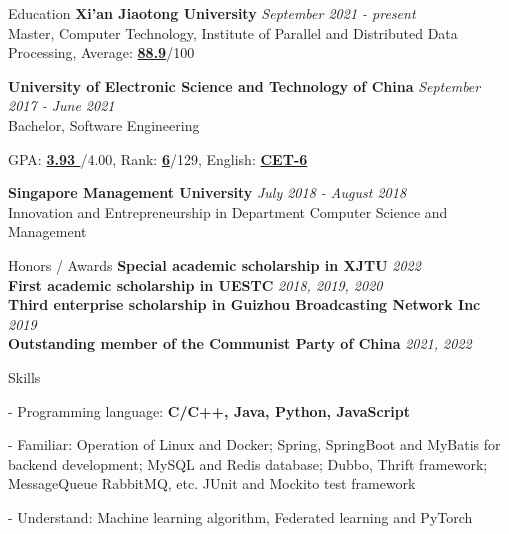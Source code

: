 \documentclass{resume} %
\begin{document}

\begin{rSection}{Education}
{\textbf{Xi'an Jiaotong University}} \hfill {\em September 2021 - present} \\ 
Master, Computer Technology, Institute of Parallel and Distributed Data Processing, Average: \textbf{\underline{88.9}}/100

{\textbf{University of Electronic Science and Technology of China}} \hfill {\em September 2017 - June 2021} \\
Bachelor, Software Engineering
\begin{rSubsection}{}{}{}{}
\item GPA: \textbf{\underline{ 3.93 }}/4.00, Rank: \textbf{\underline{6}}/129, English: \textbf{\underline{CET-6}}
\end{rSubsection}

{\textbf{Singapore Management University}} \hfill {\em July 2018 - August 2018} \\ 
Innovation and Entrepreneurship in Department Computer Science and Management

\end{rSection}


\begin{rSection}{Honors / Awards}
    {\textbf{Special academic scholarship in XJTU}} \hfill {\em 2022} \\
    {\textbf{First academic scholarship in UESTC}} \hfill {\em 2018, 2019, 2020} \\
    {\textbf{Third enterprise scholarship in Guizhou Broadcasting Network Inc}} \hfill {\em 2019} \\
    {\textbf{Outstanding member of the Communist Party of China}} \hfill {\em 2021, 2022}
\end{rSection}



\begin{rSection}{Skills}
    \begin{rSubsection}
    {}{}{}{}
        \item[-] Programming language: \textbf{C/C++, Java, Python, JavaScript}
        \item[-] Familiar: Operation of Linux and Docker; Spring, SpringBoot and MyBatis for backend development; MySQL and Redis database; Dubbo, Thrift framework; MessageQueue RabbitMQ, etc. JUnit and Mockito test framework
        \item[-] Understand: Machine learning algorithm, Federated learning and PyTorch
    \end{rSubsection}
\end{rSection}
    
\end{document}
